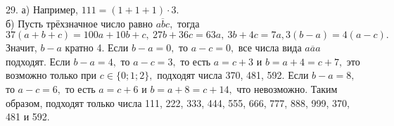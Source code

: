 29. а) Например, $111=(1+1+1)\cdot3.$\\
б) Пусть трёхзначное число равно $\overline{abc},$ тогда $37(a+b+c)=100a+10b+c,\ 27b+36c=63a,\ 3b+4c=7a, 3(b-a)=4(a-c).$ Значит, $b-a$ кратно 4. Если $b-a=0,$ то $a-c=0,$ все числа вида $\overline{aaa}$ подходят. Если $b-a=4,$ то $a-c=3,$ то есть $a=c+3$ и $b=a+4=c+7,$ это возможно только при $c\in\{0;1;2\},$ подходят числа 370, 481, 592. Если $b-a=8,$ то $a-c=6,$ то есть $a=c+6$ и $b=a+8=c+14,$ что невозможно. Таким образом, подходят только числа 111, 222, 333, 444, 555, 666, 777, 888, 999, 370, 481 и 592.\\
